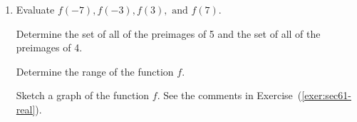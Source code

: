 \begin{enumerate}
\begin{enumerate}
 \item Evaluate  $f( { - 7} ), f( { - 3} ), f( 3 ), \text{ and }f( 7 )$.

  \yitem Determine the set of all of the preimages of  5 and the set of all of the preimages of 4.

  \yitem Determine the range of the function  $f$\!.

  \yitem Sketch a graph of the function  $f$.  See the comments in Exercise~(\ref{exer:sec61-real}).
\end{enumerate}


%
%

%
%
%
%
%


\end{enumerate}
